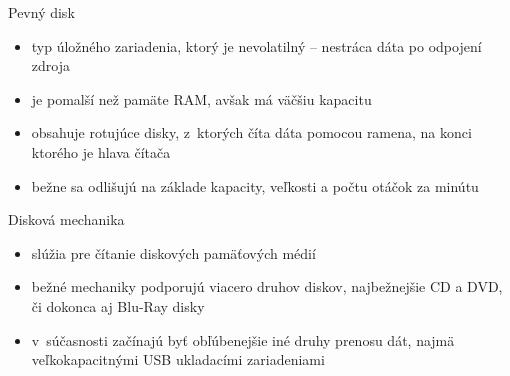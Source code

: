 \documentclass[pdf,fyma]{prosper}
\begin{document}
\begin{slide}{Pevný disk}
\begin{itemize}
\item typ úložného zariadenia, ktorý je nevolatilný -- nestráca dáta po odpojení zdroja
\item je pomalší než pamäte RAM, avšak má väčšiu kapacitu
\item obsahuje rotujúce disky, z~ktorých číta dáta pomocou ramena, na konci ktorého je hlava čítača
\item bežne sa odlišujú na základe kapacity, veľkosti a počtu otáčok za minútu
\end{itemize}
\end{slide}

\begin{slide}{Disková mechanika}
\begin{itemize}
\item slúžia pre čítanie diskových pamäťových médií
\item bežné mechaniky podporujú viacero druhov diskov, najbežnejšie CD a DVD, či dokonca aj Blu-Ray disky
\item v~súčasnosti začínajú byť obľúbenejšie iné druhy prenosu dát, najmä veľkokapacitnými USB ukladacími zariadeniami
\end{itemize}
\begin{figure}[ht]
  \begin{center}
  \label{cd_drive}
  \end{center}
\end{figure}
\end{slide}
\end{document}
